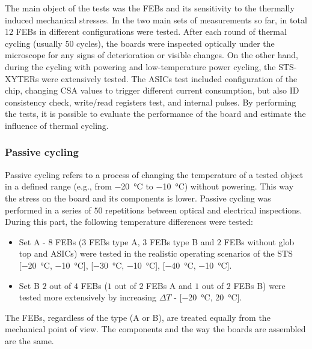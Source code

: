 The main object of the tests was the \gls{FEB}s and its sensitivity to the thermally induced mechanical stresses. In the two main sets of measurements so far, in total $12$ \gls{FEB}s in different configurations were tested.  After each round of thermal cycling (usually $50$ cycles), the boards were inspected optically under the microscope for any signs of deterioration or visible changes. On the other hand, during the cycling with powering and low-temperature power cycling, the STS-XYTERs were extensively tested. The \glspl{ASIC} test included configuration of the chip, changing \gls{CSA} values to trigger different current consumption, but also ID consistency check, write/read registers test, and internal pulses. By performing the tests, it is possible to evaluate the performance of the board and estimate the influence of thermal cycling.

\subsubsection{Passive cycling}
Passive cycling refers to a process of changing the temperature of a tested object in a defined range (e.g., from \SI{-20}{\celsius} to \SI{-10}{\celsius}) without powering. This way the stress on the board and its components is lower. Passive cycling was performed in a series of $50$ repetitions between optical and electrical inspections. During this part, the following temperature differences were tested:
\begin{itemize}
    \item Set A - $8$ \glspl{FEB} ($3$ \glspl{FEB} type A, $3$ \glspl{FEB} type B and $2$ \glspl{FEB} without glob top and \glspl{ASIC}) were tested in the realistic operating scenarios of the \gls{STS} [\SI{-20}{\celsius}, \SI{-10}{\celsius}], [\SI{-30}{\celsius}, \SI{-10}{\celsius}], [\SI{-40}{\celsius}, \SI{-10}{\celsius}].
    \item Set B $2$ out of $4$ \glspl{FEB} ($1$ out of $2$ \glspl{FEB} A and $1$ out of $2$ \glspl{FEB} B) were tested more extensively by increasing $\Delta T$ - [\SI{-20}{\celsius}, \SI{20}{\celsius}].
\end{itemize}
The \glspl{FEB}, regardless of the type (A or B), are treated equally from the mechanical point of view. The components and the way the boards are assembled are the same.


